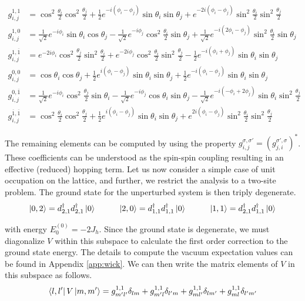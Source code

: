 \begin{align*}
    g_{i, j}^{1, 1} &= \cos^2 \frac{\theta_i}{2} \cos ^2  \frac{\theta_j}{2}  + \frac{1}{2}e^{-i(\phi_i - \phi_j)}\sin\theta_i\sin\theta_j + e^{-2i(\phi_i - \phi_j)}\sin^2 \frac{\theta_i}{2} \sin^2 \frac{\theta_j}{2}\\
%
    g_{i, j}^{1, 0} &= \frac{1}{\sqrt{2}}e^{-i\phi_i}\sin\theta_i\cos\theta_j - \frac{1}{\sqrt{2}}e^{-i\phi_j}\cos^2\frac{\theta_i}{2}  \sin\theta_j + \frac{1}{\sqrt{2}}e^{-i(2\phi_i - \phi_j)} \sin ^2  \frac{\theta_i}{2} \sin\theta_j\\
%    
    g_{i, j}^{1, \overline{1}} &=  e^{-2i\phi_i} \cos^2\frac{\theta_j}{2}\sin^2\frac{\theta_i}{2} + e^{-2i\phi_j}\cos^2\frac{\theta_i}{2}\sin^2\frac{\theta_j}{2} - \frac{1}{2}e^{-i(\phi_i + \phi_j)}\sin\theta_i\sin\theta_j\\
%   
    g_{i, j}^{0, 0} &=  \cos\theta_i\cos\theta_j + \frac{1}{2}e^{i(\phi_i - \phi_j)}\sin\theta_i\sin\theta_j + \frac{1}{2}e^{-i(\phi_i - \phi_j)}\sin\theta_i\sin\theta_j \\
%    
    g_{i, j}^{0, \overline{1}} &=  \frac{1}{\sqrt{2}}e^{-i\phi_i}\cos^2\frac{\theta_j}{2}\sin\theta_i - \frac{1}{\sqrt{2}}e^{-i\phi_j}\cos\theta_i\sin\theta_j - \frac{1}{\sqrt{2}}e^{-i(-\phi_i + 2\phi_j)}\sin\theta_i\sin^2\frac{\theta_j}{2}\\
%    
    g_{i, j}^{\overline{1}, \overline{1}} &= \cos^2\frac{\theta_i}{2}\cos^2\frac{\theta_j}{2} + \frac{1}{2}e^{i(\phi_i - \phi_j)}\sin\theta_i\sin\theta_j + e^{2i(\phi_i - \phi_j)}\sin^2\frac{\theta_i}{2}\sin^2\frac{\theta_j}{2}
\end{align*}

The remaining elements can be computed by using the property $g_{i, j}^{\sigma, \sigma'} = (g_{j, i}^{\sigma', \sigma})^*$. These coefficients can be understood as the spin-spin coupling resulting in an effective (reduced) hopping term. Let us now consider a simple case of unit occupation on the lattice, and further, we restrict the analysis to a two-site problem. The ground state for the unperturbed system is then triply degenerate.
$$\ket{0, 2} = d_{2, 1}^{\dagger}d_{2, 1}^{\dagger}\ket{0} \hspace{1cm} \ket{2, 0} = d_{1, 1}^{\dagger}d_{1, 1}^{\dagger}\ket{0}\hspace{1cm}\ket{1, 1} = d_{2, 1}^{\dagger}d_{1, 1}^{\dagger}\ket{0}$$

with energy $E_0^{(0)} = -2J_h$. Since the ground state is degenerate, we must diagonalize $V$ within this subspace to calculate the first order correction to the ground state energy. The details to compute the vacuum expectation values can be found in Appendix \ref{app:wick}. We can then write the matrix elements of $V$ in this subspace as follows.
\begin{equation}
    \bra{l, l'}V\ket{m,m'} = g_{m'l'}^{1,1} \delta_{lm} + g_{m'l}^{1,1}\delta_{l'm} + g_{ml'}^{1,1}\delta_{lm'} + g_{ml}^{1,1} \delta_{l'm'}
\end{equation}

